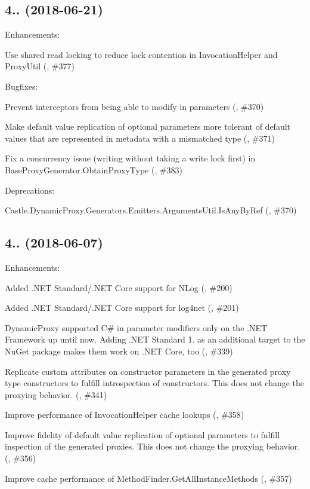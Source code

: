 \subsection*{4.. (2018-\/06-\/21)}

Enhancements\+:
\begin{DoxyItemize}
\item Use shared read locking to reduce lock contention in Invocation\+Helper and Proxy\+Util (, \#377)
\end{DoxyItemize}

Bugfixes\+:
\begin{DoxyItemize}
\item Prevent interceptors from being able to modify {\ttfamily in} parameters (, \#370)
\item Make default value replication of optional parameters more tolerant of default values that are represented in metadata with a mismatched type (, \#371)
\item Fix a concurrency issue (writing without taking a write lock first) in {\ttfamily Base\+Proxy\+Generator.\+Obtain\+Proxy\+Type} (, \#383)
\end{DoxyItemize}

Deprecations\+:
\begin{DoxyItemize}
\item {\ttfamily Castle.\+Dynamic\+Proxy.\+Generators.\+Emitters.\+Arguments\+Util.\+Is\+Any\+By\+Ref} (, \#370)
\end{DoxyItemize}

\subsection*{4.. (2018-\/06-\/07)}

Enhancements\+:
\begin{DoxyItemize}
\item Added .N\+ET Standard/.N\+ET Core support for N\+Log (, \#200)
\item Added .N\+ET Standard/.N\+ET Core support for log4net (, \#201)
\item Dynamic\+Proxy supported C\# {\ttfamily in} parameter modifiers only on the .N\+ET Framework up until now. Adding .N\+ET Standard 1. as an additional target to the Nu\+Get package makes them work on .N\+ET Core, too (, \#339)
\item Replicate custom attributes on constructor parameters in the generated proxy type constructors to fulfill introspection of constructors. This does not change the proxying behavior. (, \#341)
\item Improve performance of Invocation\+Helper cache lookups (, \#358)
\item Improve fidelity of default value replication of optional parameters to fulfill inspection of the generated proxies. This does not change the proxying behavior. (, \#356)
\item Improve cache performance of Method\+Finder.\+Get\+All\+Instance\+Methods (, \#357)
\end{DoxyItemize}


